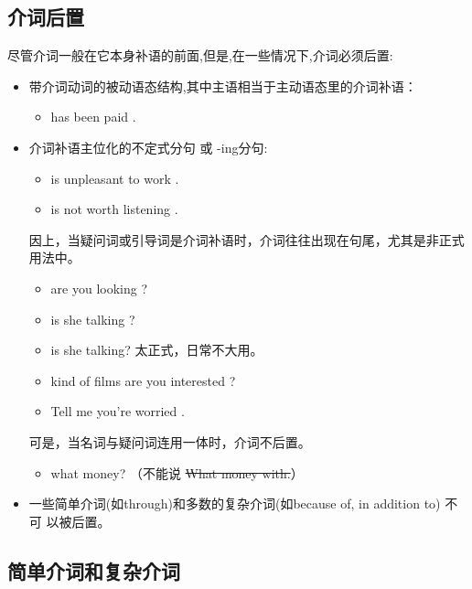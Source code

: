 \subsection{介词后置}

尽管介词一般在它本身补语的前面,但是,在一些情况下,介词必须后置:
\begin{itemize}
\item 带介词动词的被动语态结构,其中主语相当于主动语态里的介词补语：
  \begin{itemize}
  \item {} has been paid .
  \end{itemize}

\item 介词补语主位化的不定式分句 或 -ing分句:
  \begin{itemize}
  \item {} is unpleasant to work .

  \item {} is not worth listening .
  \end{itemize}

  因上，当疑问词或引导词是介词补语时，介词往往出现在句尾，尤其是非正式用法中。
  \begin{itemize}
  \item {} are you looking ?
  \item {} is she talking ?
  \item {} is she talking? 太正式，日常不大用。
  \item {} kind of films are you interested ?
  \item Tell me  you're worried .
  \end{itemize}

  可是，当名词与疑问词连用一体时，介词不后置。
  \begin{itemize}
  \item {} what money? （不能说 \sout{What money with.}）
  \end{itemize}

\item 一些简单介词(如through)和多数的复杂介词(如because of, in addition to) 不可
  以被后置。

\end{itemize}

\subsection{简单介词和复杂介词}

